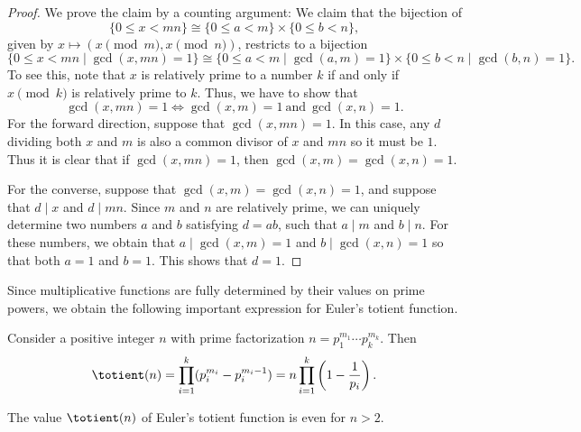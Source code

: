 \begin{proof}
  We prove the claim by a counting argument: We claim that the bijection of 
  \begin{equation*}
    \{0\leq x<mn\}\cong
    \{0\leq a<m\}\times
    \{0\leq b<n\},
  \end{equation*}
  given by $x\mapsto(x\pmod{m},x\pmod{n})$, restricts to a bijection
  \begin{equation*}
    \{0\leq x<mn\mid\gcd(x,mn)=1\} \cong
    \{0\leq a<m\mid\gcd(a,m)=1\}\times
    \{0\leq b<n\mid\gcd(b,n)=1\}.
  \end{equation*}
  To see this, note that $x$ is relatively prime to a number $k$ if and only if $x\pmod{k}$ is relatively prime to $k$. Thus, we have to show that
  \begin{equation*}
    \gcd(x,mn)=1 \Leftrightarrow \gcd(x,m)=1~\text{and}~\gcd(x,n)=1.
  \end{equation*}
  For the forward direction, suppose that $\gcd(x,mn)=1$. In this case, any $d$ dividing both $x$ and $m$ is also a common divisor of $x$ and $mn$ so it must be $1$. Thus it is clear that if $\gcd(x,mn)=1$, then $\gcd(x,m)=\gcd(x,n)=1$.

  For the converse, suppose that $\gcd(x,m)=\gcd(x,n)=1$, and suppose that $d\mid x$ and $d\mid mn$. Since $m$ and $n$ are relatively prime, we can uniquely determine two numbers $a$ and $b$ satisfying $d=ab$, such that $a\mid m$ and $b\mid n$. For these numbers, we obtain that $a\mid\gcd(x,m)=1$ and $b\mid\gcd(x,n)=1$ so that both $a=1$ and $b=1$. This shows that $d=1$. 
\end{proof}

Since multiplicative functions are fully determined by their values on prime powers, we obtain the following important expression for Euler's totient function.

\begin{theorem}\label{theorem:product-formula-totient}
  Consider a positive integer $n$ with prime factorization $n=p_1^{m_1}\cdots p_k^{m_k}$. Then
  \begin{equation*}
    \totient(n)=\prod_{i=1}^k(p_i^{m_i}-p_i^{m_i-1})=n\prod_{i=1}^k\left(1-\frac{1}{p_i}\right).
  \end{equation*}
\end{theorem}

\begin{corollary}
  The value $\totient(n)$ of Euler's totient function is even for $n>2$.
\end{corollary}

